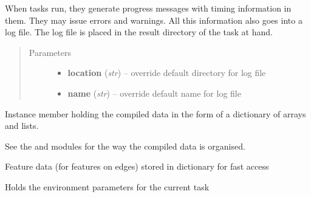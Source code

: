 \documentclass[letterpaper,10pt,english]{sphinxmanual}
\begin{document}
\begin{fulllineitems}
\begin{fulllineitems}
When tasks run, they generate progress messages with timing information in them.
They may issue errors and warnings. All this information also goes into a log file.
The log file is placed in the result directory of the task at hand.
\begin{quote}\begin{description}
\item[{Parameters}] \leavevmode\begin{itemize}
\item {} 
\textbf{location} (\emph{str}) --
override default directory for log file

\item {} 
\textbf{name} (\emph{str}) --
override default name for log file

\end{itemize}

\end{description}\end{quote}

\end{fulllineitems}


\begin{fulllineitems}
\label{graf/graf:graf.graf.Graf.data_items}
Instance member holding the compiled data in the form of a dictionary of arrays and lists.

See the {\hyperref[graf/graf:module-graf.compiler]{}} and {\hyperref[graf/graf:module-graf.model]{}} modules for the way the compiled data is organised.

\end{fulllineitems}


\begin{fulllineitems}
\label{graf/graf:graf.graf.Graf.edge_feat}
Feature data (for features on edges) stored in dictionary for fast access

\end{fulllineitems}


\begin{fulllineitems}
\label{graf/graf:graf.graf.Graf.env}
Holds the environment parameters for the current task


\end{fulllineitems}
\end{fulllineitems}
\end{document}
